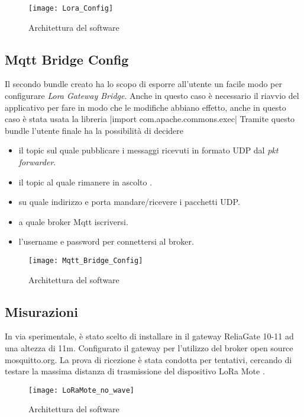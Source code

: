 \begin{figure}[h]
\centering 
\texttt{[image: Lora\_Config]}
\caption{Architettura del software}
\label{fig:Software_stack}
\end{figure}



\subsection{Mqtt Bridge Config}
Il secondo bundle creato ha lo scopo di esporre all'utente un facile modo per
configurare  \emph{Lora Gateway Bridge}.  Anche in questo caso è necessario il
riavvio del applicativo per fare in modo che le modifiche abbiano effetto, anche
in questo caso è stata usata la libreria
|import com.apache.commons.exec|
Tramite questo bundle l'utente finale ha la possibilità di decidere 
\begin{itemize}
\item il topic sul quale pubblicare i messaggi ricevuti in formato UDP dal
\emph{pkt forwarder}.
\item il topic al quale rimanere in ascolto .
\item su quale indirizzo e porta mandare/ricevere i pacchetti UDP.
\item a quale broker Mqtt iscriversi.
\item l'username e password per connettersi al broker.
\end{itemize}

\begin{figure}[h]
\centering 
\texttt{[image: Mqtt\_Bridge\_Config]}
\caption{Architettura del software}
\label{fig:Software_stack}
\end{figure}

\subsection{Misurazioni}
In via sperimentale, è stato scelto di installare in  il gateway
ReliaGate 10-11 ad una altezza di 11m. Configurato il gateway per l'utilizzo del
broker open source  mosquitto.org. La prova di ricezione è stata condotta per
tentativi, cercando di testare la massima distanza di trasmissione del
dispositivo LoRa Mote . 

\begin{figure}[h]
\centering 
\texttt{[image: LoRaMote\_no\_wave]}
\caption{Architettura del software}
\label{fig:Software_stack}
\end{figure}

